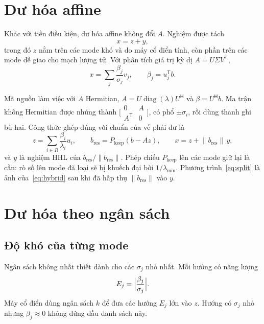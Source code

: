 \documentclass[11pt,a4paper]{article}
\newenvironment{revisedblock}{\par\color{revised}\ignorespaces}{\par}
\begin{document}
\section{Dư hóa affine}
Khác với tiền điều kiện, dư hóa affine không đổi \(A\).
Nghiệm được tách
\begin{equation}
  x = z + y,
  \label{eq:split}
\end{equation}
trong đó \(z\) nằm trên các mode khó và do máy cổ điển tính, còn phần trên các mode dễ giao cho mạch lượng tử.
Với phân tích giá trị kỳ dị \(A=U\Sigma V^{\mathsf T}\),
\begin{equation}
  x = \sum_j \frac{\beta_j}{\sigma_j} v_j,
  \qquad \beta_j = u_j^{\mathsf T} b.
  \label{eq:svd}
\end{equation}

\begin{revisedblock}
Mã nguồn làm việc với \(A\) Hermitian, \(A=U\operatorname{diag}(\lambda)U^{\mathsf H}\) và \(\beta=U^{\mathsf H}b\).
Ma trận không Hermitian được nhúng thành \(\bigl[\begin{smallmatrix}0&A\\ A^{\mathsf T}&0\end{smallmatrix}\bigr]\), có phổ \(\pm\sigma_i\), rồi dùng thanh ghi bù hai.
Công thức ghép đúng với chuẩn của vế phải dư là
\begin{equation}
  z = \sum_{i\in R}\frac{\beta_i}{\lambda_i}u_i,
  \qquad
  b_{\mathrm{res}} = P_{\mathrm{keep}}(b-Az),
  \qquad
  x = z + \lVert b_{\mathrm{res}}\rVert\, y,
  \label{eq:hybrid}
\end{equation}
và \(y\) là nghiệm HHL của \(b_{\mathrm{res}}/\lVert b_{\mathrm{res}}\rVert\).
Phép chiếu \(P_{\mathrm{keep}}\) lên các mode giữ lại là cần: rò số lên mode đã loại sẽ bị khuếch đại bởi \(1/\lambda_{\min}\).
Phương trình~\eqref{eq:split} là ảnh của~\eqref{eq:hybrid} sau khi đã hấp thụ \(\lVert b_{\mathrm{res}}\rVert\) vào \(y\).
\end{revisedblock}

\section{Dư hóa theo ngân sách}

\subsection{Độ khó của từng mode}
Ngân sách không nhất thiết dành cho các \(\sigma_j\) nhỏ nhất.
Mỗi hướng có năng lượng
\begin{equation}
  E_j = \Bigl\lvert\frac{\beta_j}{\sigma_j}\Bigr\rvert.
  \label{eq:energy}
\end{equation}
Máy cổ điển dùng ngân sách \(k\) để đưa các hướng \(E_j\) lớn vào \(z\).
Hướng có \(\sigma_j\) nhỏ nhưng \(\beta_j\approx 0\) không đứng đầu danh sách này.
\end{document}
